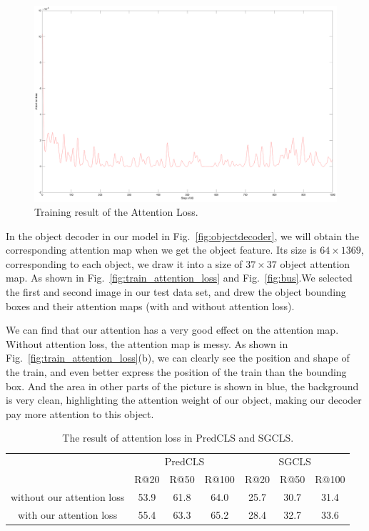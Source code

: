 \begin{figure}[h!]
	\centering
	\includegraphics[width=0.8\linewidth]{figures/result/attention_loss}
	\caption[Training result of the Attention Loss]{Training result of the Attention Loss.}
	\label{fig:attention_loss_result}
\end{figure}

In the object decoder in our model in Fig.~\ref{fig:objectdecoder}, we will obtain the corresponding attention map when we get the object feature. Its size is $ 64\times1369 $, corresponding to each object, we draw it into a size of $ 37\times37 $ object attention map. As shown in Fig.~\ref{fig:train_attention_loss} and Fig.~\ref{fig:bus}.We selected the first and second image in our test data set, and drew the object bounding boxes and their attention maps (with and without attention loss).

We can find that our attention has a very good effect on the attention map. Without attention loss, the attention map is messy. As shown in Fig.~\ref{fig:train_attention_loss}(b), we can clearly see the position and shape of the train, and even better express the position of the train than the bounding box. And the area in other parts of the picture is shown in blue, the background is very clean, highlighting the attention weight of our object, making our decoder pay more attention to this object.


\begin{table}[!h]
	\centering
	\begin{tabular}{c|ccc|ccc}
		\bottomrule
		\multirow{2}{*}{}           & \multicolumn{3}{c|}{PredCLS} & \multicolumn{3}{c}{SGCLS} \\ \cline{2-7} 
		& R@20    & R@50    & R@100    & R@20   & R@50   & R@100   \\ \hline
		without our attention  loss & 53.9      & 61.8       & 64.0       & 25.7     & 30.7     & 31.4   \\
		with our attention loss     & 55.4       & 63.3       & 65.2        & 28.4      & 32.7      &33.6     \\ \bottomrule
	\end{tabular}

\caption[The result of attention loss in PredCLS and SGCLS]{The result of attention loss in PredCLS and SGCLS.}
\label{tab:result_attetnion_loss}
\end{table}

